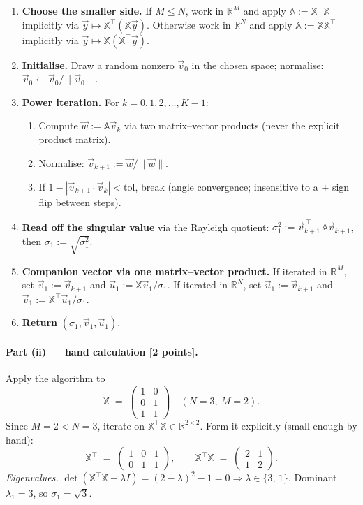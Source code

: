 \documentclass[12pt,a4paper]{article}
\begin{document}
\begin{enumerate}[label=\textbf{\arabic*.},leftmargin=*]
\item \textbf{Choose the smaller side.} If $M \le N$, work in $\mathbb{R}^M$ and apply $\mathbb{A} := \mathbb{X}^\top\mathbb{X}$ implicitly via $\vec y \mapsto \mathbb{X}^\top(\mathbb{X}\vec y)$. Otherwise work in $\mathbb{R}^N$ and apply $\mathbb{A} := \mathbb{X}\mathbb{X}^\top$ implicitly via $\vec y \mapsto \mathbb{X}(\mathbb{X}^\top\vec y)$.
\item \textbf{Initialise.} Draw a random nonzero $\vec v_0$ in the chosen space; normalise: $\vec v_0 \leftarrow \vec v_0 / \lVert\vec v_0\rVert$.
\item \textbf{Power iteration.} For $k = 0, 1, 2, \dots, K-1$:
\begin{enumerate}[label=(\alph*),leftmargin=*]
\item Compute $\vec w := \mathbb{A}\vec v_k$ via two matrix--vector products (never the explicit product matrix).
\item Normalise: $\vec v_{k+1} := \vec w / \lVert\vec w\rVert$.
\item If $1 - |\vec v_{k+1}\cdot\vec v_k| < \mathrm{tol}$, break (angle convergence; insensitive to a $\pm$ sign flip between steps).
\end{enumerate}
\item \textbf{Read off the singular value} via the Rayleigh quotient: $\sigma_1^2 := \vec v_{k+1}^{\,\top}\,\mathbb{A}\vec v_{k+1}$, then $\sigma_1 := \sqrt{\sigma_1^2}$.
\item \textbf{Companion vector via one matrix--vector product.} If iterated in $\mathbb{R}^M$, set $\vec v_1 := \vec v_{k+1}$ and $\vec u_1 := \mathbb{X}\vec v_1/\sigma_1$. If iterated in $\mathbb{R}^N$, set $\vec u_1 := \vec v_{k+1}$ and $\vec v_1 := \mathbb{X}^\top\vec u_1/\sigma_1$.
\item \textbf{Return} $(\sigma_1, \vec v_1, \vec u_1)$.
\end{enumerate}

\paragraph{Part (ii) --- hand calculation [2 points].} Apply the algorithm to
\[
\mathbb{X} \;=\; \begin{pmatrix} 1 & 0 \\ 0 & 1 \\ 1 & 1 \end{pmatrix} \quad (N=3,\ M=2).
\]
Since $M=2<N=3$, iterate on $\mathbb{X}^\top\mathbb{X}\in\mathbb{R}^{2\times 2}$. Form it explicitly (small enough by hand):
\[
\mathbb{X}^\top \;=\; \begin{pmatrix} 1 & 0 & 1 \\ 0 & 1 & 1 \end{pmatrix},
\qquad
\mathbb{X}^\top\mathbb{X} \;=\; \begin{pmatrix} 2 & 1 \\ 1 & 2 \end{pmatrix}.
\]
\emph{Eigenvalues.} $\det(\mathbb{X}^\top\mathbb{X} - \lambda I) = (2-\lambda)^2 - 1 = 0 \Rightarrow \lambda \in \{3,\,1\}$. Dominant $\lambda_1 = 3$, so $\sigma_1 = \sqrt{3}$.
\end{document}
